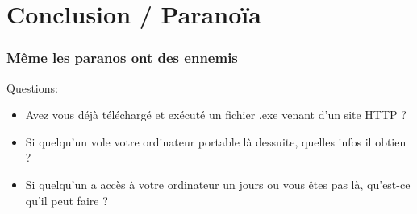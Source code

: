 
\section{Conclusion / Paranoïa}

\begin{frame}
\frametitle{Même les paranos ont des ennemis}

\begin{center}

Questions:

\begin{itemize}
    \item Avez vous déjà téléchargé et exécuté un fichier .exe venant d'un site HTTP ?
    \item Si quelqu'un vole votre ordinateur portable là dessuite, quelles infos il obtien ?
    \item Si quelqu'un a accès à votre ordinateur un jours ou vous êtes pas là, qu'est-ce qu'il peut faire ?
\end{itemize}


\end{center}




\end{frame}

